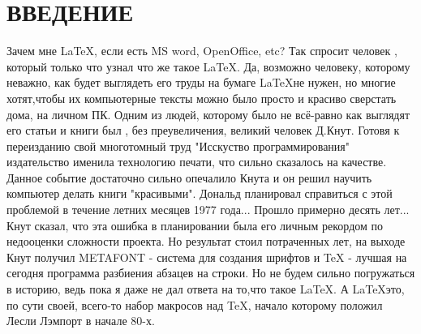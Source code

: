 \documentclass[a4paper,14pt,russian]{extreport}
\newcommand{\toCenter}[1]{\begin{center}#1\par\end{center}}
\begin{document}

\renewcommand\contentsname{\toCenter{\huge{Содержание}}} 	%
\renewcommand{\thechapter}{\arabic{chapter}} 				%

\renewcommand*\etoctoclineleaders
{\hbox{\bfseries\normalsize\hbox to .75ex {\hss.\hss}}} 	%

\tableofcontents											%
\setcounter{tocdepth}{1} 									%

\newpage

\chapter*{ВВЕДЕНИЕ}


Зачем мне \LaTeX, если есть MS word, OpenOffice, etc? Так спросит человек , который только что узнал что же такое \LaTeX. Да, возможно человеку, которому неважно, как будет выглядеть его труды на бумаге \LaTeX не нужен, но многие хотят,чтобы их компьютерные тексты можно было просто и красиво сверстать дома, на личном ПК. Одним из людей, которому было не всё-равно как выглядят его статьи и книги был , без преувеличения, великий человек Д.Кнут. Готовя к переизданию свой многотомный труд "Исскуство программирования" издательство именила технологию печати, что сильно сказалось на качестве. Данное событие достаточно сильно опечалило Кнута и он решил научить компьютер делать книги "красивыми". Дональд планировал справиться с этой проблемой в течение летних месяцев 1977 года... Прошло примерно десять лет... Кнут сказал, что эта ошибка в планировании была его личным рекордом по недооценки сложности проекта. 
Но результат стоил потраченных лет, на выходе Кнут получил METAFONT - система для создания шрифтов и TeX - лучшая на сегодня программа разбиения абзацев на строки. Но не будем сильно погружаться в историю, ведь пока я даже не дал ответа на то,что такое \LaTeX. А \LaTeX это, по сути своей, всего-то набор макросов над \TeX, начало которому положил Лесли Лэмпорт в начале 80-х. 
\end{document}
